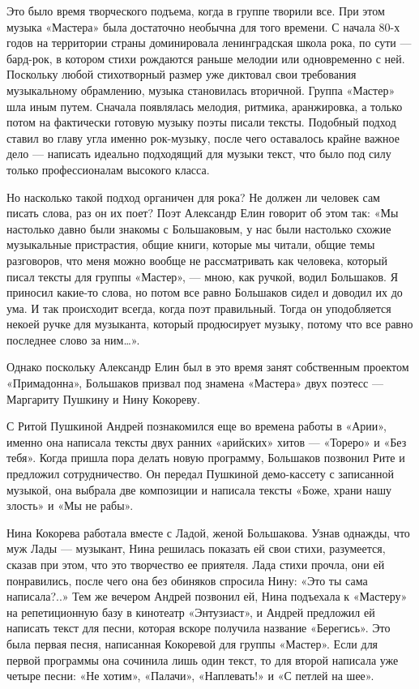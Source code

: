 \documentclass[10pt, twoside]{book}
\begin{document}
Это было время творческого подъема, когда в группе творили все. При этом музыка «Мастера» была достаточно необычна для
того времени. С начала 80-х годов на территории страны доминировала ленинградская школа рока, по сути — бард-рок, в
котором стихи рождаются раньше мелодии или одновременно с ней. Поскольку любой стихотворный размер уже диктовал свои
требования музыкальному обрамлению, музыка становилась вторичной. Группа «Мастер» шла иным путем. Сначала появлялась
мелодия, ритмика, аранжировка, а только потом на фактически готовую музыку поэты писали тексты. Подобный подход ставил
во главу угла именно рок-музыку, после чего оставалось крайне важное дело — написать идеально подходящий для музыки
текст, что было под силу только профессионалам высокого класса.

Но насколько такой подход органичен для рока? Не должен ли человек сам писать слова, раз он их поет? Поэт Александр Елин
говорит об этом так: «Мы настолько давно были знакомы с Большаковым, у нас были настолько схожие музыкальные
пристрастия, общие книги, которые мы читали, общие темы разговоров, что меня можно вообще не рассматривать как человека,
который писал тексты для группы «Мастер», — мною, как ручкой, водил Большаков. Я приносил какие-то слова, но потом все
равно Большаков сидел и доводил их до ума. И так происходит всегда, когда поэт правильный. Тогда он уподобляется некоей
ручке для музыканта, который продюсирует музыку, потому что все равно последнее слово за ним\ldots».

Однако поскольку Александр Елин был в это время занят собственным проектом «Примадонна», Большаков призвал под знамена
«Мастера» двух поэтесс — Маргариту Пушкину и Нину Кокореву.

С Ритой Пушкиной Андрей познакомился еще во времена работы в «Арии», именно она написала тексты двух ранних «арийских»
хитов — «Тореро» и «Без тебя». Когда пришла пора делать новую программу, Большаков позвонил Рите и предложил
сотрудничество. Он передал Пушкиной демо-кассету с записанной музыкой, она выбрала две композиции и написала тексты
«Боже, храни нашу злость» и «Мы не рабы».

Нина Кокорева работала вместе с Ладой, женой Большакова. Узнав однажды, что муж Лады — музыкант, Нина решилась показать
ей свои стихи, разумеется, сказав при этом, что это творчество ее приятеля. Лада стихи прочла, они ей понравились, после
чего она без обиняков спросила Нину: «Это ты сама написала?..» Тем же вечером Андрей позвонил ей, Нина подъехала к
«Мастеру» на репетиционную базу в кинотеатр «Энтузиаст», и Андрей предложил ей написать текст для песни, которая вскоре
получила название «Берегись». Это была первая песня, написанная Кокоревой для группы «Мастер». Если для первой программы
она сочинила лишь один текст, то для второй написала уже четыре песни: «Не хотим», «Палачи», «Наплевать!» и «С петлей на
шее».
\end{document}
